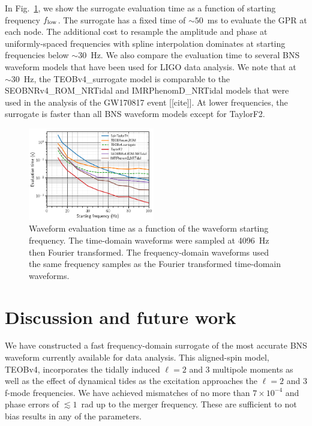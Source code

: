 \documentclass[prd,aps,letter,twocolumn,floatfix,notitlepage,nofootinbib]{revtex4-1}
\begin{document}
In Fig.~\ref{fig:timing}, we show the surrogate evaluation time as a function of starting frequency $f_{\rm low}$. The surrogate has a fixed time of $\sim 50$~ms to evaluate the GPR at each node. The additional cost to resample the amplitude and phase at uniformly-spaced frequencies with spline interpolation dominates at starting frequencies below $\sim 30$~Hz. We also compare the evaluation time to several BNS waveform models that have been used for LIGO data analysis. We note that at $\sim 30$~Hz, the TEOBv4\_surrogate model is comparable to the SEOBNRv4\_ROM\_NRTidal and IMRPhenomD\_NRTidal models that were used in the analysis of the GW170817 event [[cite]]. At lower frequencies, the surrogate is faster than all BNS waveform models except for TaylorF2. 

\begin{figure}[htb]
\centering
\includegraphics[width=0.49\textwidth]{timing.png}
\caption{Waveform evaluation time as a function of the waveform starting frequency. The time-domain waveforms
were sampled at 4096~Hz then Fourier transformed. The frequency-domain waveforms used the
same frequency samples as the Fourier transformed time-domain waveforms.}
\label{fig:timing}
\end{figure}

\section{Discussion and future work}

We have constructed a fast frequency-domain surrogate of the most accurate BNS waveform currently available for data analysis. This aligned-spin model, TEOBv4, incorporates the tidally induced $\ell=2$ and 3 multipole moments as well as the effect of dynamical tides as the excitation approaches the $\ell=2$ and 3 f-mode frequencies. We have achieved mismatches of no more than $7 \times 10^{-4}$ and phase errors of $\lesssim 1$~rad up to the merger frequency. These are sufficient to not bias results in any of the parameters.
\end{document}
